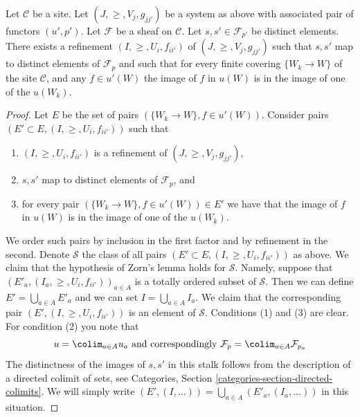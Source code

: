 \begin{lemma}
\label{lemma-refine-all-at-once}
Let $\mathcal{C}$ be a site.
Let $(J, \geq, V_j, g_{jj'})$ be a system as above with associated
pair of functors $(u', p')$.
Let $\mathcal{F}$ be a sheaf on $\mathcal{C}$.
Let $s, s' \in \mathcal{F}_{p'}$ be distinct elements.
There exists a refinement $(I, \geq, U_i, f_{ii'})$
of $(J, \geq, V_j, g_{jj'})$ such that $s, s'$ map
to distinct elements of $\mathcal{F}_p$ and such that
for every finite covering $\{W_k \to W\}$ of the site
$\mathcal{C}$, and any $f \in u'(W)$ the image of $f$ in $u(W)$
is in the image of one of the $u(W_k)$.
\end{lemma}

\begin{proof}
Let $E$ be the set of pairs $(\{W_k \to W\}, f\in u'(W))$.
Consider pairs $(E' \subset E, (I, \geq, U_i, f_{ii'}))$
such that
\begin{enumerate}
\item $(I, \geq, U_i, f_{ii'})$ is a refinement of $(J, \geq, V_j, g_{jj'})$,
\item $s, s'$ map to distinct elements of $\mathcal{F}_p$, and
\item for every pair $(\{W_k \to W\}, f\in u'(W)) \in E'$ we have that
the image of $f$ in $u(W)$ is in the image of one of the $u(W_k)$.
\end{enumerate}
We order such pairs by inclusion in the first factor and
by refinement in the second. Denote $\mathcal{S}$ the class
of all pairs $(E' \subset E, (I, \geq, U_i, f_{ii'}))$ as above.
We claim that the hypothesis of Zorn's lemma holds for $\mathcal{S}$. Namely,
suppose that $(E'_a, (I_a, \geq, U_i, f_{ii'}))_{a \in A}$
is a totally ordered subset of $\mathcal{S}$. Then we can define
$E' = \bigcup_{a \in A} E'_a$ and we can set $I = \bigcup_{a \in A} I_a$.
We claim that the corresponding pair
$(E' , (I, \geq, U_i, f_{ii'}))$ is an element of $\mathcal{S}$.
Conditions (1) and (3) are clear. For condition (2) you note
that
$$
u = \colim_{a \in A} u_a
\text{ and correspondingly }
\mathcal{F}_p = \colim_{a \in A} \mathcal{F}_{p_a}
$$
The distinctness of the images of $s, s'$ in this stalk follows
from the description of a directed colimit of sets, see
Categories, Section \ref{categories-section-directed-colimits}.
We will simply write
$(E', (I, \ldots)) = \bigcup_{a \in A}(E'_a, (I_a, \ldots))$
in this situation.


\end{proof}
